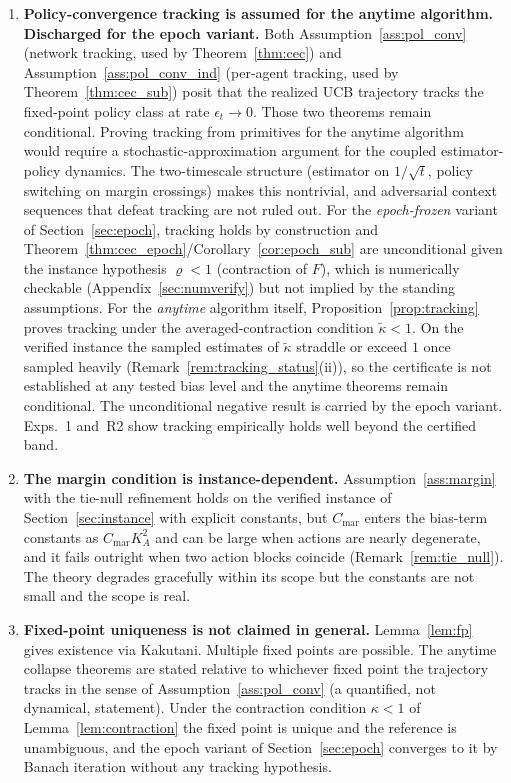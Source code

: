\documentclass[11pt]{article}
\begin{document}
\begin{enumerate}[C1.]
\item \textbf{Policy-convergence tracking is assumed for the anytime
algorithm. Discharged for the epoch variant.}
Both Assumption~\ref{ass:pol_conv} (network tracking, used by
Theorem~\ref{thm:cec}) and Assumption~\ref{ass:pol_conv_ind}
(per-agent tracking, used by Theorem~\ref{thm:cec_sub}) posit that the
realized UCB trajectory tracks the fixed-point policy class at rate
$\epsilon_t\to 0$. Those two theorems remain conditional.  Proving
tracking from primitives for the anytime algorithm would require a
stochastic-approximation argument for the coupled estimator-policy
dynamics. The two-timescale structure (estimator on $1/\sqrt t$,
policy switching on margin crossings) makes this nontrivial, and
adversarial context sequences that defeat tracking are not ruled out.
For the \emph{epoch-frozen} variant of Section~\ref{sec:epoch},
tracking holds by construction and
Theorem~\ref{thm:cec_epoch}/Corollary~\ref{cor:epoch_sub} are
unconditional given the instance hypothesis $\varrho<1$ (contraction
of $F$), which is numerically checkable
(Appendix~\ref{sec:numverify}) but not implied by the standing
assumptions.  For the \emph{anytime} algorithm itself,
Proposition~\ref{prop:tracking} proves tracking under the
averaged-contraction condition $\tilde\kappa<1$. On the verified
instance the sampled estimates of $\tilde\kappa$ straddle or exceed
$1$ once sampled heavily (Remark~\ref{rem:tracking_status}(ii)), so
the certificate is not established at any tested bias level and the
anytime theorems remain conditional. The unconditional negative
result is carried by the epoch variant.  Exps.~1 and~R2 show tracking
empirically holds well beyond the certified band.

\item \textbf{The margin condition is instance-dependent.}
Assumption~\ref{ass:margin} with the tie-null refinement holds on the
verified instance of Section~\ref{sec:instance} with explicit
constants, but $C_{\mathrm{mar}}$ enters the bias-term constants as
$C_{\mathrm{mar}}K_A^2$ and can be large when actions are nearly
degenerate, and it fails outright when two action blocks coincide
(Remark~\ref{rem:tie_null}). The theory degrades gracefully within its
scope but the constants are not small and the scope is real.

\item \textbf{Fixed-point uniqueness is not claimed in general.}
Lemma~\ref{lem:fp} gives existence via Kakutani. Multiple fixed points
are possible.  The anytime collapse theorems are stated relative to
whichever fixed point the trajectory tracks in the sense of
Assumption~\ref{ass:pol_conv} (a quantified, not dynamical,
statement). Under the contraction condition $\kappa<1$ of
Lemma~\ref{lem:contraction} the fixed point is unique and the
reference is unambiguous, and the epoch variant of
Section~\ref{sec:epoch} converges to it by Banach iteration without
any tracking hypothesis.


\end{enumerate}
\end{document}
